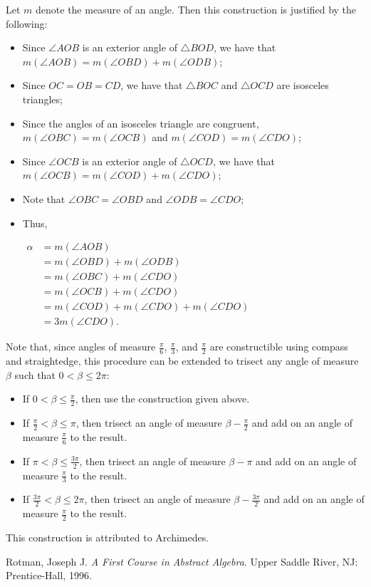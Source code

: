 \documentclass[12pt]{article}
\begin{document}
Let $m$ denote the measure of an angle.  Then this construction is justified by the following:

\begin{itemize}
\item Since $\angle AOB$ is an exterior angle of $\triangle BOD$, we have that $m(\angle AOB)=m(\angle OBD)+m(\angle ODB)$;
\item Since $OC=OB=CD$, we have that $\triangle BOC$ and $\triangle OCD$ are isosceles triangles;
\item Since the angles of an isosceles triangle are congruent, $m(\angle OBC)=m(\angle OCB)$ and $m(\angle COD)=m(\angle CDO)$;
\item Since $\angle OCB$ is an exterior angle of $\triangle OCD$, we have that $m(\angle OCB)=m(\angle COD)+m(\angle CDO)$;
\item Note that $\angle OBC=\angle OBD$ and $\angle ODB=\angle CDO$;
\item Thus,

\begin{center}
$\begin{array}{rl}
\alpha & =m(\angle AOB) \\
& =m(\angle OBD)+m(\angle ODB) \\
& =m(\angle OBC)+m(\angle CDO) \\
& =m(\angle OCB)+m(\angle CDO) \\
& =m(\angle COD)+m(\angle CDO)+m(\angle CDO) \\
& =3m(\angle CDO). \end{array}$
\end{center}
\end{itemize}

Note that, since angles of measure $\frac{\pi}{6}$, $\frac{\pi}{3}$, and $\frac{\pi}{2}$ are constructible using compass and straightedge, this procedure can be extended to trisect any angle of measure $\beta$ such that $0<\beta\le 2\pi$:

\begin{itemize}
\item If $0<\beta\le\frac{\pi}{2}$, then use the construction given above.
\item If $\frac{\pi}{2}<\beta\le\pi$, then trisect an angle of measure $\beta-\frac{\pi}{2}$ and add on an angle of measure $\frac{\pi}{6}$ to the result.
\item If $\pi<\beta\le\frac{3\pi}{2}$, then trisect an angle of measure $\beta-\pi$ and add on an angle of measure $\frac{\pi}{3}$ to the result.
\item If $\frac{3\pi}{2}<\beta\le 2\pi$, then trisect an angle of measure $\beta-\frac{3\pi}{2}$ and add on an angle of measure $\frac{\pi}{2}$ to the result.
\end{itemize}

This construction is attributed to Archimedes.

\begin{thebibliography}{9}
 Rotman, Joseph J. {\em A First Course in Abstract Algebra}. Upper Saddle River, NJ: Prentice-Hall, 1996.
\end{thebibliography}


\end{document}
